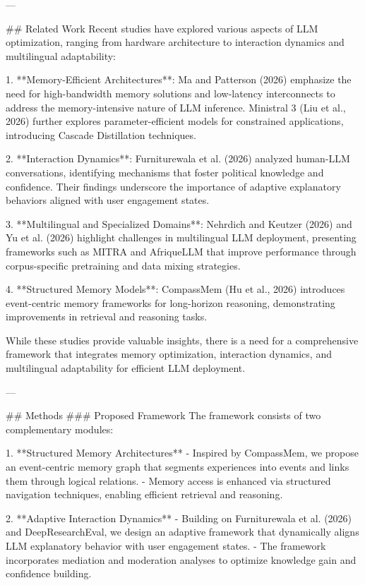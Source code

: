 ---

## Related Work
Recent studies have explored various aspects of LLM optimization, ranging from hardware architecture to interaction dynamics and multilingual adaptability:

1. **Memory-Efficient Architectures**: Ma and Patterson (2026) emphasize the need for high-bandwidth memory solutions and low-latency interconnects to address the memory-intensive nature of LLM inference. Ministral 3 (Liu et al., 2026) further explores parameter-efficient models for constrained applications, introducing Cascade Distillation techniques.

2. **Interaction Dynamics**: Furniturewala et al. (2026) analyzed human-LLM conversations, identifying mechanisms that foster political knowledge and confidence. Their findings underscore the importance of adaptive explanatory behaviors aligned with user engagement states.

3. **Multilingual and Specialized Domains**: Nehrdich and Keutzer (2026) and Yu et al. (2026) highlight challenges in multilingual LLM deployment, presenting frameworks such as MITRA and AfriqueLLM that improve performance through corpus-specific pretraining and data mixing strategies.

4. **Structured Memory Models**: CompassMem (Hu et al., 2026) introduces event-centric memory frameworks for long-horizon reasoning, demonstrating improvements in retrieval and reasoning tasks.

While these studies provide valuable insights, there is a need for a comprehensive framework that integrates memory optimization, interaction dynamics, and multilingual adaptability for efficient LLM deployment.

---

## Methods
### Proposed Framework
The framework consists of two complementary modules: 

1. **Structured Memory Architectures**
   - Inspired by CompassMem, we propose an event-centric memory graph that segments experiences into events and links them through logical relations.
   - Memory access is enhanced via structured navigation techniques, enabling efficient retrieval and reasoning.

2. **Adaptive Interaction Dynamics**
   - Building on Furniturewala et al. (2026) and DeepResearchEval, we design an adaptive framework that dynamically aligns LLM explanatory behavior with user engagement states.
   - The framework incorporates mediation and moderation analyses to optimize knowledge gain and confidence building.

